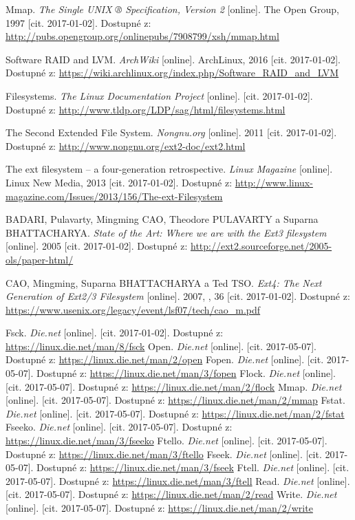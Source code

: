 \begin{literatura}{99}
    Mmap. \emph{The Single UNIX ® Specification, Version 2} [online]. The Open Group, 1997 [cit. 2017-01-02]. Dostupné z: \url{http://pubs.opengroup.org/onlinepubs/7908799/xsh/mmap.html}

    Software RAID and LVM. \emph{ArchWiki} [online]. ArchLinux, 2016 [cit. 2017-01-02]. Dostupné z: \url{https://wiki.archlinux.org/index.php/Software_RAID_and_LVM}

    Filesystems. \emph{The Linux Documentation Project} [online]. [cit. 2017-01-02]. Dostupné z: \url{http://www.tldp.org/LDP/sag/html/filesystems.html}

    The Second Extended File System. \emph{Nongnu.org} [online]. 2011 [cit. 2017-01-02]. Dostupné z: \url{http://www.nongnu.org/ext2-doc/ext2.html}

    The ext filesystem – a four-generation retrospective. \emph{Linux Magazine} [online]. Linux New Media, 2013 [cit. 2017-01-02]. Dostupné z: \url{http://www.linux-magazine.com/Issues/2013/156/The-ext-Filesystem}

    BADARI, Pulavarty, Mingming CAO, Theodore PULAVARTY a Suparna BHATTACHARYA. \emph{State of the Art: Where we are with the Ext3 filesystem} [online]. 2005 [cit. 2017-01-02]. Dostupné z: \url{http://ext2.sourceforge.net/2005-ols/paper-html/}

    CAO, Mingming, Suparna BHATTACHARYA a Ted TSO. \emph{Ext4: The Next Generation of  Ext2/3 Filesystem} [online]. 2007, , 36 [cit. 2017-01-02]. Dostupné z: \url{https://www.usenix.org/legacy/event/lsf07/tech/cao_m.pdf}

    Fsck. \emph{Die.net} [online]. [cit. 2017-01-02]. Dostupné z: \url{https://linux.die.net/man/8/fsck}
    Open. \emph{Die.net} [online]. [cit. 2017-05-07]. Dostupné z: \url{https://linux.die.net/man/2/open}
    Fopen. \emph{Die.net} [online]. [cit. 2017-05-07]. Dostupné z: \url{https://linux.die.net/man/3/fopen}
    Flock. \emph{Die.net} [online]. [cit. 2017-05-07]. Dostupné z: \url{https://linux.die.net/man/2/flock}
    Mmap. \emph{Die.net} [online]. [cit. 2017-05-07]. Dostupné z: \url{https://linux.die.net/man/2/mmap}
    Fstat. \emph{Die.net} [online]. [cit. 2017-05-07]. Dostupné z: \url{https://linux.die.net/man/2/fstat}
    Fseeko. \emph{Die.net} [online]. [cit. 2017-05-07]. Dostupné z: \url{https://linux.die.net/man/3/fseeko}
    Ftello. \emph{Die.net} [online]. [cit. 2017-05-07]. Dostupné z: \url{https://linux.die.net/man/3/ftello}
    Fseek. \emph{Die.net} [online]. [cit. 2017-05-07]. Dostupné z: \url{https://linux.die.net/man/3/fseek}
    Ftell. \emph{Die.net} [online]. [cit. 2017-05-07]. Dostupné z: \url{https://linux.die.net/man/3/ftell}
    Read. \emph{Die.net} [online]. [cit. 2017-05-07]. Dostupné z: \url{https://linux.die.net/man/2/read}
    Write. \emph{Die.net} [online]. [cit. 2017-05-07]. Dostupné z: \url{https://linux.die.net/man/2/write}


\end{literatura}
